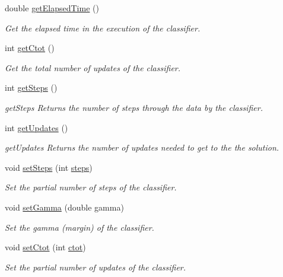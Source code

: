 \begin{DoxyCompactItemize}
double \hyperlink{class_classifier_abbed7a8ea8050ae19a2c4c5f4a5e6002}{get\+Elapsed\+Time} ()
\begin{DoxyCompactList}\small\item\em Get the elapsed time in the execution of the classifier. \end{DoxyCompactList}\item 
int \hyperlink{class_classifier_aefd89af30ccd3e38194946bacecdf82a}{get\+Ctot} ()
\begin{DoxyCompactList}\small\item\em Get the total number of updates of the classifier. \end{DoxyCompactList}\item 
int \hyperlink{class_classifier_a6e6d5041d6945bc62581323d2d3b5ab1}{get\+Steps} ()
\begin{DoxyCompactList}\small\item\em get\+Steps Returns the number of steps through the data by the classifier. \end{DoxyCompactList}\item 
int \hyperlink{class_classifier_abde870e234b342455e113e05900f7339}{get\+Updates} ()
\begin{DoxyCompactList}\small\item\em get\+Updates Returns the number of updates needed to get to the the solution. \end{DoxyCompactList}\item 
void \hyperlink{class_classifier_a55c37a2a00b3dce578d6fde547376dae}{set\+Steps} (int \hyperlink{class_classifier_a154ed9ff7a3d989ed25dda7215289f64}{steps})
\begin{DoxyCompactList}\small\item\em Set the partial number of steps of the classifier. \end{DoxyCompactList}\item 
void \hyperlink{class_classifier_a8ce9a9a19a9deceb12e39e54ef595650}{set\+Gamma} (double gamma)
\begin{DoxyCompactList}\small\item\em Set the gamma (margin) of the classifier. \end{DoxyCompactList}\item 
void \hyperlink{class_classifier_a318ff28416f40269c532a80827fb30fb}{set\+Ctot} (int \hyperlink{class_classifier_af3bc30b5c675507c12b23fbbc7164093}{ctot})
\begin{DoxyCompactList}\small\item\em Set the partial number of updates of the classifier. \end{DoxyCompactList}\item 

\end{DoxyCompactItemize}
